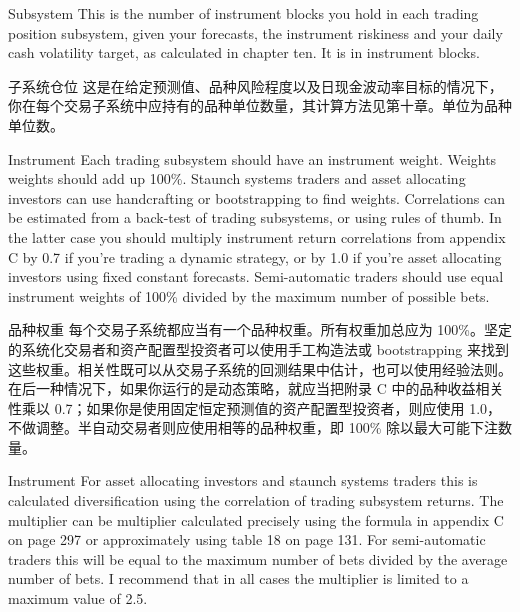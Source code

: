 
\begin{englishblock} Subsystem This is the number of instrument blocks you hold in each trading position subsystem, given your forecasts, the instrument riskiness and your daily cash volatility target, as calculated in chapter ten. It is in instrument blocks. \end{englishblock}

\begin{chineseblock}子系统仓位 这是在给定预测值、品种风险程度以及日现金波动率目标的情况下，你在每个交易子系统中应持有的品种单位数量，其计算方法见第十章。单位为品种单位数。\end{chineseblock}

\bipairgap

\begin{englishblock} Instrument Each trading subsystem should have an instrument weight. Weights weights should add up 100\%. Staunch systems traders and asset allocating investors can use handcrafting or bootstrapping to find weights. Correlations can be estimated from a back-test of trading subsystems, or using rules of thumb. In the latter case you should multiply instrument return correlations from appendix C by 0.7 if you're trading a dynamic strategy, or by 1.0 if you're asset allocating investors using fixed constant forecasts. Semi-automatic traders should use equal instrument weights of 100\% divided by the maximum number of possible bets. \end{englishblock}

\begin{chineseblock}品种权重 每个交易子系统都应当有一个品种权重。所有权重加总应为 100\%。坚定的系统化交易者和资产配置型投资者可以使用手工构造法或 bootstrapping 来找到这些权重。相关性既可以从交易子系统的回测结果中估计，也可以使用经验法则。在后一种情况下，如果你运行的是动态策略，就应当把附录 C 中的品种收益相关性乘以 0.7；如果你是使用固定恒定预测值的资产配置型投资者，则应使用 1.0，不做调整。半自动交易者则应使用相等的品种权重，即 100\% 除以最大可能下注数量。\end{chineseblock}

\bipairgap

\begin{englishblock} Instrument For asset allocating investors and staunch systems traders this is calculated diversification using the correlation of trading subsystem returns. The multiplier can be multiplier calculated precisely using the formula in appendix C on page 297 or approximately using table 18 on page 131. For semi-automatic traders this will be equal to the maximum number of bets divided by the average number of bets. I recommend that in all cases the multiplier is limited to a maximum value of 2.5. \end{englishblock}

